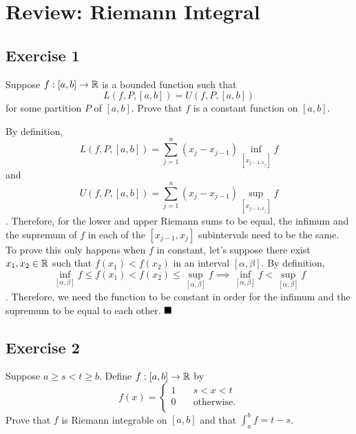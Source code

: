 \section{Review: Riemann Integral}

\subsection{Exercise 1}

\begin{formulationBox}
	Suppose $f:[a,b]\rightarrow\mathbb{R}$ is a bounded function such that \[L(f,P,[a,b]) = U(f,P,[a,b])\] for some partition $P$ of $[a,b]$. Prove that $f$ is a constant function on $[a,b]$.
\end{formulationBox}

By definition,
\begin{equation*}
	L(f, P, [a, b]) = \sum_{j=1}^{n}(x_j-x_{j-1})\inf_{[x_{j-1,x_j}]}f
\end{equation*}
and
	\begin{equation*}
	U(f, P, [a, b]) = \sum_{j=1}^{n}(x_j-x_{j-1})\sup_{[x_{j-1,x_j}]}f
\end{equation*}
.
\newpara
Therefore, for the lower and upper Riemann sums to be equal, the infimum and the supremum of $f$ in each of the $[x_{j-1},x_j]$ subintervals need to be the same. To prove this only happens when $f$ in constant, let's suppose there exist $x_1, x_2\in\mathbb{R}$ such that $f(x_1) < f(x_2)$ in an interval $[\alpha,\beta]$. By definition,
\begin{equation*}
	\inf_{[\alpha,\beta]}f \leq f(x_1) < f(x_2) \leq  \sup_{[\alpha,\beta]}f \implies \inf_{[\alpha,\beta]}f < \sup_{[\alpha,\beta]}f
\end{equation*}. Therefore, we need the function to be constant in order for the infimum and the supremum to be equal to each other.
$\qed$

\subsection{Exercise 2}

\begin{formulationBox}
	Suppose $a\geq s<t\geq b$. Define $f:[a,b]\rightarrow\mathbb{R}$ by
	\[
		f(x) =
		\begin{cases}
			1 &\quad s<x<t\\
			0 &\quad \textrm{otherwise.}\\ 
		\end{cases}
	\]
	Prove that $f$ is Riemann integrable on $[a,b]$ and that $\int_a^bf=t-s$.
\end{formulationBox}

